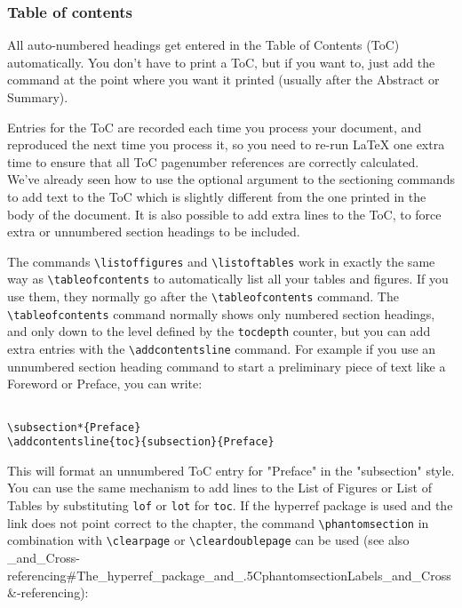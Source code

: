 \subsubsection{ Table of contents }

All auto-numbered headings get entered in the Table of Contents (ToC) automatically. You don't have to print a ToC, but if you want to, just add the command \texttt{\tableofcontents} at the point where you want it printed (usually after the Abstract or
Summary).

Entries for the ToC are recorded each time you process your document, and reproduced the next time you process it, so you need to re-run LaTeX one extra time to ensure that all ToC pagenumber references are correctly calculated. We've already seen how to use the optional argument to the sectioning commands to add text to the ToC which is slightly different from the one printed in the body of the document. It is also possible to add extra lines to the ToC, to force extra or unnumbered section headings to be included.

The commands \lstinline{\listoffigures} and \lstinline{\listoftables} work in exactly the same way as \lstinline{\tableofcontents} to automatically list all your tables and figures. If you use them, they normally go after the \lstinline{\tableofcontents} command. The \lstinline{\tableofcontents} command normally shows only numbered section headings, and only down to the level defined by the \lstinline{tocdepth} counter, but you can add extra entries with the \lstinline{\addcontentsline} command. For example if you use an unnumbered section heading command to start a preliminary piece of text like a Foreword or Preface, you can write:

\begin{lstlisting}

\subsection*{Preface}
\addcontentsline{toc}{subsection}{Preface}

\end{lstlisting}


This will format an unnumbered ToC entry for "Preface" in the "subsection" style. You can use the same mechanism to add lines to the List of Figures or List of Tables by substituting \texttt{lof} or \texttt{lot} for \texttt{toc}. If the hyperref package is used and the link does not point correct to the chapter, the command \lstinline{\phantomsection} in combination with \lstinline{\clearpage} or \lstinline{\cleardoublepage} can be used (see also \_and\_Cross-referencing#The\_hyperref\_package\_and\_.5CphantomsectionLabels\_and\_Cross &-referencing):

